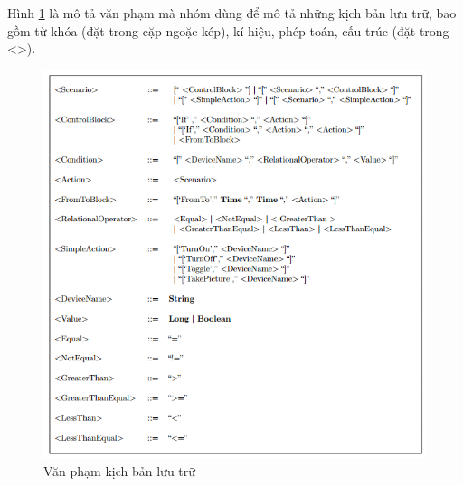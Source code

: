 \documentclass[12pt,a4paper,oneside]{extbook}
\begin{document}
\noindent
Hình \ref{fig:6-system-grammar}  là mô tả văn phạm mà nhóm dùng để mô tả những kịch bản lưu trữ, bao gồm từ khóa (đặt trong cặp ngoặc kép), kí hiệu, phép toán, cấu trúc (đặt trong <>).

\begin{figure}[h!]
  \centering
    \includegraphics[width=16cm]{6-system-grammar}
  \caption{Văn phạm kịch bản lưu trữ}\label{fig:6-system-grammar}
\end{figure}
\end{document}
